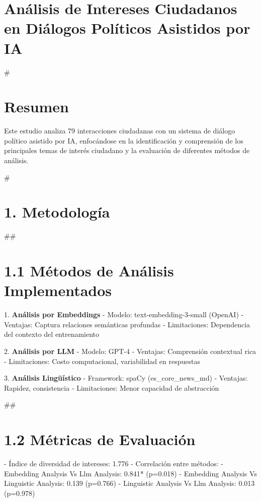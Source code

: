 \documentclass[12pt,a4paper]{article}
\author{Análisis de Resultados - Political Discourse Analyzer}
\date{\today}
\begin{document}
\maketitle

\section{Análisis de Intereses Ciudadanos en Diálogos Políticos Asistidos por IA}

            #\section{Resumen}
            Este estudio analiza 79 interacciones ciudadanas con un sistema de diálogo 
            político asistido por IA, enfocándose en la identificación y comprensión de los principales temas de 
            interés ciudadano y la evaluación de diferentes métodos de análisis.

            #\section{1. Metodología}

            ##\section{1.1 Métodos de Análisis Implementados}
            1. \textbf{Análisis por Embeddings}
            - Modelo: text-embedding-3-small (OpenAI)
            - Ventajas: Captura relaciones semánticas profundas
            - Limitaciones: Dependencia del contexto del entrenamiento

            2. \textbf{Análisis por LLM}
            - Modelo: GPT-4
            - Ventajas: Comprensión contextual rica
            - Limitaciones: Costo computacional, variabilidad en respuestas

            3. \textbf{Análisis Lingüístico}
            - Framework: spaCy (es_core_news_md)
            - Ventajas: Rapidez, consistencia
            - Limitaciones: Menor capacidad de abstracción

            ##\section{1.2 Métricas de Evaluación}
            - Índice de diversidad de intereses: 1.776
            - Correlación entre métodos:
              - Embedding Analysis Vs Llm Analysis: 0.841* (p=0.018)
  - Embedding Analysis Vs Linguistic Analysis: 0.139 (p=0.766)
  - Linguistic Analysis Vs Llm Analysis: 0.013 (p=0.978)
\end{document}
